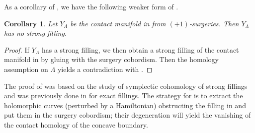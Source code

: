 \documentclass[reqno,11pt]{amsart}
\numberwithin{equation}{section}
\newtheorem{corollary}[theorem]{\textbf{Corollary}}
\begin{document}
As a corollary of , we have the following weaker form of .
\begin{corollary}\label{cor:nofilling}
    Let $Y_{\Lambda}$ be the contact manifold in  from $(+1)$-surgeries. Then $Y_{\Lambda}$ has no strong filling.
\end{corollary}
\begin{proof}
    If $Y_{\Lambda}$ has a strong filling, we then obtain a strong filling of the contact manifold in  by gluing with the surgery cobordism. Then the homology assumption on $\Lambda$ yields a contradiction with . 
\end{proof}
The proof of  was based on the study of symplectic cohomology of strong fillings and was previously done in \cite{zbMATH07673358} for exact fillings. The strategy for  is to extract the holomorphic curves (perturbed by a Hamiltonian) obstructing the filling in  and put them in the surgery cobordism; their degeneration will yield the vanishing of the contact homology of the concave boundary. 
\end{document}
